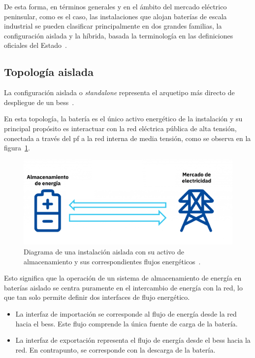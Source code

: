 De esta forma, en términos generales y en el ámbito del mercado eléctrico peninsular, como es el caso, las instalaciones que alojan baterías de escala industrial se pueden clasificar principalmente en dos grandes familias, la configuración aislada y la híbrida, basada la terminología en las definiciones oficiales del Estado~\cite{cnmc2024servicios}.

\subsection{Topología aislada}
\label{makereference3.1.1}

La configuración aislada o \textit{standalone} representa el arquetipo más directo de despliegue de un \gls{bess}~\cite{gallo2023stand}.

En esta topología, la batería es el único activo energético de la instalación y su principal propósito es interactuar con la red eléctrica pública de alta tensión, conectada a través del \gls{pf} a la red interna de media tensión, como se observa en la figura~\ref{fig:topologia-aislada}.

\begin{figure}
  \centering
  \includegraphics[width=0.5\linewidth]{figures/topologia-aislada.png}
  \caption[Diagrama de una instalación aislada.]{Diagrama de una instalación aislada con su activo de almacenamiento y sus correspondientes flujos energéticos~\cite{aleasoft2025la}.}
  \label{fig:topologia-aislada}
\end{figure}

Esto significa que la operación de un sistema de almacenamiento de energía en baterías aislado se centra puramente en el intercambio de energía con la red, lo que tan solo permite definir dos interfaces de flujo energético.

\begin{itemize}

  \item La interfaz de importación se corresponde al flujo de energía desde la red hacia el \gls{bess}. Este flujo comprende la única fuente de carga de la batería.

  \item  La interfaz de exportación representa el flujo de energía desde el \gls{bess} hacia la red. En contrapunto, se corresponde con la descarga de la batería.

\end{itemize}

